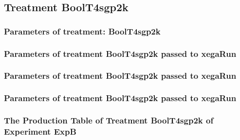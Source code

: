 \documentclass[18pt,c]{beamer}
\makeatletter
\def\beamer@writeslidentry@miniframesoff{%
  \expandafter\beamer@ifempty\expandafter{\beamer@framestartpage}{}%
  {%
   \clearpage\beamer@notesactions%
  }
}
\newcommand*{\miniframesoff}{\let\beamer@writeslidentry=\beamer@writeslidentry@miniframesoff}
\makeatother
\begin{document}
\miniframesoff
\subsection{Treatment BoolT4sgp2k}

 \begin{frame}
 \fontsize{8pt}{9pt}\selectfont
 \frametitle{  Parameters of treatment: BoolT4sgp2k 
 }

 \label{ExpBtParmTable080.tex}  
 \end{frame}


 \begin{frame}
 \fontsize{8pt}{9pt}\selectfont
 \frametitle{  Parameters of treatment BoolT4sgp2k passed to xegaRun
 }

 \label{ExpBtParmTable081.tex}  
 \end{frame}


 \begin{frame}
 \fontsize{8pt}{9pt}\selectfont
 \frametitle{  Parameters of treatment BoolT4sgp2k passed to xegaRun
 }

 \label{ExpBtParmTable082.tex}  
 \end{frame}


 \begin{frame}
 \fontsize{8pt}{9pt}\selectfont
 \frametitle{  Parameters of treatment BoolT4sgp2k passed to xegaRun
 }

 \label{ExpBtParmTable083.tex}  
 \end{frame}

 \begin{frame}
 \fontsize{8pt}{9pt}\selectfont
 \frametitle{ The Production Table of Treatment BoolT4sgp2k of Experiment ExpB }

 \label{ExpBGrammarTable026.tex}  
 \end{frame}
\end{document}
